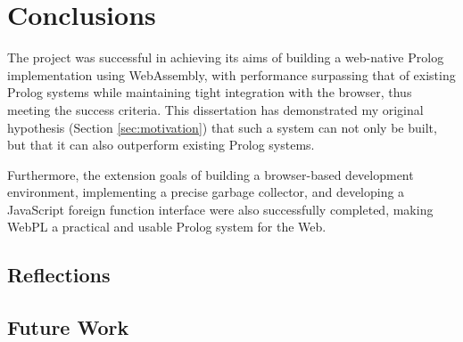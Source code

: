 \chapter{Conclusions}

The project was successful in achieving its aims of building a web-native Prolog implementation using WebAssembly, with performance surpassing that of existing Prolog systems while maintaining tight integration with the browser, thus meeting the success criteria. This dissertation has demonstrated my original hypothesis (Section \ref{sec:motivation}) that such a system can not only be built, but that it can also outperform existing Prolog systems.

Furthermore, the extension goals of building a browser-based development environment, implementing a precise garbage collector, and developing a JavaScript foreign function interface were also successfully completed, making WebPL a practical and usable Prolog system for the Web.

\section{Reflections}



\section{Future Work}